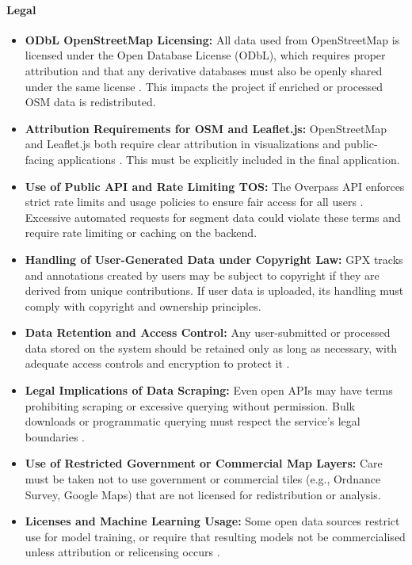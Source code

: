 \documentclass{article}
\begin{document}
\paragraph{Legal}

\begin{itemize}
	\item \textbf{ODbL OpenStreetMap Licensing:} All data used from OpenStreetMap is licensed under the Open Database License (ODbL), which requires proper attribution and that any derivative databases must also be openly shared under the same license \citep{osmodbl}. This impacts the project if enriched or processed OSM data is redistributed.
	\item \textbf{Attribution Requirements for OSM and Leaflet.js:} OpenStreetMap and Leaflet.js both require clear attribution in visualizations and public-facing applications \citep{osmwiki, leafletdoc}. This must be explicitly included in the final application.
	\item \textbf{Use of Public API and Rate Limiting TOS:} The Overpass API enforces strict rate limits and usage policies to ensure fair access for all users \citep{overpasspolicy}. Excessive automated requests for segment data could violate these terms and require rate limiting or caching on the backend.
	\item \textbf{Handling of User-Generated Data under Copyright Law:} GPX tracks and annotations created by users may be subject to copyright if they are derived from unique contributions. If user data is uploaded, its handling must comply with copyright and ownership principles.
	\item \textbf{Data Retention and Access Control:} Any user-submitted or processed data stored on the system should be retained only as long as necessary, with adequate access controls and encryption to protect it \citep{gdpr}.
	\item \textbf{Legal Implications of Data Scraping:} Even open APIs may have terms prohibiting scraping or excessive querying without permission. Bulk downloads or programmatic querying must respect the service’s legal boundaries \citep{overpassapi}.
	\item \textbf{Use of Restricted Government or Commercial Map Layers:} Care must be taken not to use government or commercial tiles (e.g., Ordnance Survey, Google Maps) that are not licensed for redistribution or analysis.
	\item \textbf{Licenses and Machine Learning Usage:} Some open data sources restrict use for model training, or require that resulting models not be commercialised unless attribution or relicensing occurs \citep{wiley2018mllicenses}.
\end{itemize}
\end{document}
